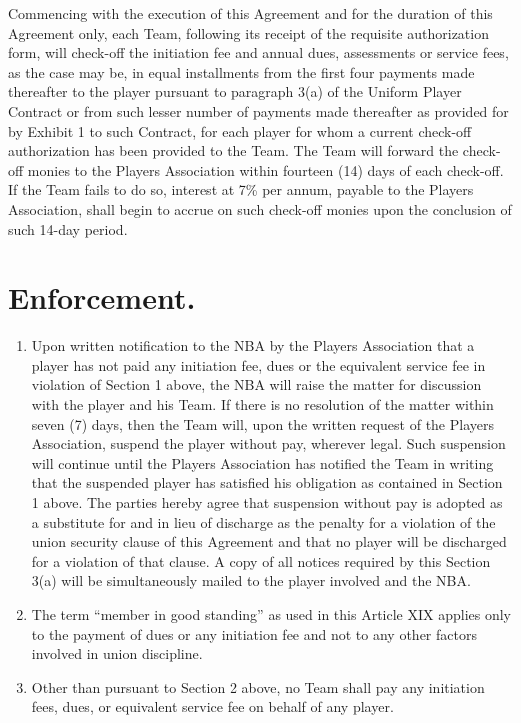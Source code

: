 \documentclass[
]{book}
\providecommand{\tightlist}{%
  \setlength{\itemsep}{0pt}\setlength{\parskip}{0pt}}
\begin{document}
Commencing with the execution of this Agreement and for the duration of this Agreement only, each Team, following its receipt of the requisite authorization form, will check-off the initiation fee and annual dues, assessments or service fees, as the case may be, in equal installments from the first four payments made thereafter to the player pursuant to paragraph 3(a) of the Uniform Player Contract or from such lesser number of payments made thereafter as provided for by Exhibit 1 to such Contract, for each player for whom a current check-off authorization has been provided to the Team. The Team will forward the check-off monies to the Players Association within fourteen (14) days of each check-off. If the Team fails to do so, interest at 7\% per annum, payable to the Players Association, shall begin to accrue on such check-off monies upon the conclusion of such 14-day period.

\hypertarget{enforcement.}{%
\section{Enforcement.}\label{enforcement.}}

\begin{enumerate}
\def\labelenumi{(\alph{enumi})}
\tightlist
\item
  Upon written notification to the NBA by the Players Association that a player has not paid any initiation fee, dues or the equivalent service fee in violation of Section 1 above, the NBA will raise the matter for discussion with the player and his Team. If there is no resolution of the matter within seven (7) days, then the Team will, upon the written request of the Players Association, suspend the player without pay, wherever legal. Such suspension will continue until the Players Association has notified the Team in writing that the suspended player has satisfied his obligation as contained in Section 1 above. The parties hereby agree that suspension without pay is adopted as a substitute for and in lieu of discharge as the penalty for a violation of the union security clause of this Agreement and that no player will be discharged for a violation of that clause. A copy of all notices required by this Section 3(a) will be simultaneously mailed to the player involved and the NBA.
\item
  The term ``member in good standing'' as used in this Article XIX applies only to the payment of dues or any initiation fee and not to any other factors involved in union discipline.
\item
  Other than pursuant to Section 2 above, no Team shall pay any initiation fees, dues, or equivalent service fee on behalf of any player.
\end{enumerate}
\end{document}
